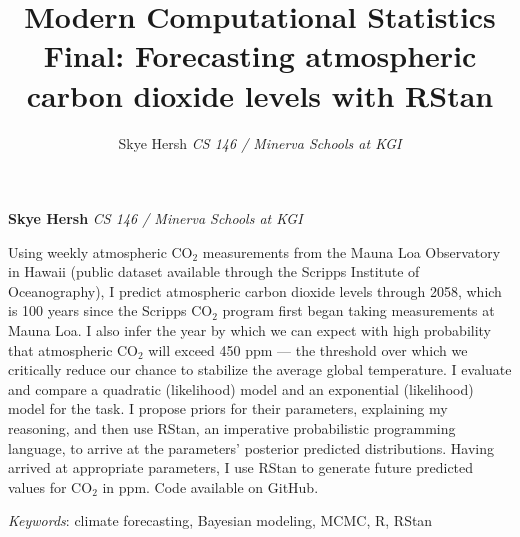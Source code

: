 \documentclass[]{article}
\title{Modern Computational Statistics Final: Forecasting atmospheric carbon
dioxide levels with RStan  }
\author{\Large Skye Hersh\vspace{0.05in} \newline\normalsize\emph{CS 146 / Minerva Schools at KGI}  }
\date{}
\newcommand*{\authorfont}{\fontfamily{phv}\selectfont}
\renewenvironment{abstract}
 {{%
    \setlength{\leftmargin}{0mm}
    \setlength{\rightmargin}{\leftmargin}%
  }%
  \relax}
 {\endlist}
\begin{document}
	
%

{%
\setlength{\parindent}{0pt}
\thispagestyle{plain}
{\fontsize{18}{20}\selectfont\raggedright 
\maketitle  %

}

{
   \vskip 13.5pt\relax \normalsize\fontsize{11}{12} 
\textbf{\authorfont Skye Hersh} \hskip 15pt \emph{\small CS 146 / Minerva Schools at KGI}   

}

}








\begin{abstract}

    \hbox{\vrule height .2pt width 39.14pc}

    \vskip 8.5pt %

\noindent Using weekly atmospheric CO\(_2\) measurements from the Mauna Loa
Observatory in Hawaii (public dataset available through the Scripps
Institute of Oceanography), I predict atmospheric carbon dioxide levels
through 2058, which is 100 years since the Scripps CO\(_2\) program
first began taking measurements at Mauna Loa. I also infer the year by
which we can expect with high probability that atmospheric CO\(_2\) will
exceed 450 ppm --- the threshold over which we critically reduce our
chance to stabilize the average global temperature. I evaluate and
compare a quadratic (likelihood) model and an exponential (likelihood)
model for the task. I propose priors for their parameters, explaining my
reasoning, and then use RStan, an imperative probabilistic programming
language, to arrive at the parameters' posterior predicted
distributions. Having arrived at appropriate parameters, I use RStan to
generate future predicted values for CO\(_2\) in ppm. Code available on
GitHub.


\vskip 8.5pt \noindent \emph{Keywords}: climate forecasting, Bayesian modeling, MCMC, R, RStan \par

    \hbox{\vrule height .2pt width 39.14pc}



\end{abstract}
\end{document}
